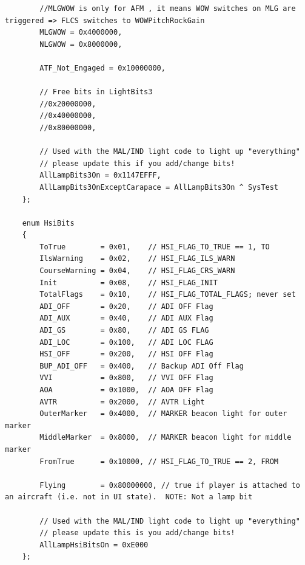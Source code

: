 \documentclass[11pt,letterpaper,titlepage]{article}
\begin{document}
\begin{landscape}
\begin{lstlisting}
		//MLGWOW is only for AFM , it means WOW switches on MLG are triggered => FLCS switches to WOWPitchRockGain
		MLGWOW = 0x4000000,
		NLGWOW = 0x8000000,

		ATF_Not_Engaged = 0x10000000,
		
		// Free bits in LightBits3		
		//0x20000000,
		//0x40000000,
		//0x80000000,

		// Used with the MAL/IND light code to light up "everything"
        // please update this if you add/change bits!
		AllLampBits3On = 0x1147EFFF,
		AllLampBits3OnExceptCarapace = AllLampBits3On ^ SysTest
    };

    enum HsiBits
    {
        ToTrue        = 0x01,    // HSI_FLAG_TO_TRUE == 1, TO
        IlsWarning    = 0x02,    // HSI_FLAG_ILS_WARN
        CourseWarning = 0x04,    // HSI_FLAG_CRS_WARN
        Init          = 0x08,    // HSI_FLAG_INIT
        TotalFlags    = 0x10,    // HSI_FLAG_TOTAL_FLAGS; never set
        ADI_OFF       = 0x20,    // ADI OFF Flag
        ADI_AUX       = 0x40,    // ADI AUX Flag
        ADI_GS        = 0x80,    // ADI GS FLAG
        ADI_LOC       = 0x100,   // ADI LOC FLAG
        HSI_OFF       = 0x200,   // HSI OFF Flag
        BUP_ADI_OFF   = 0x400,   // Backup ADI Off Flag
        VVI           = 0x800,   // VVI OFF Flag
        AOA           = 0x1000,  // AOA OFF Flag
        AVTR          = 0x2000,  // AVTR Light
		OuterMarker   = 0x4000,  // MARKER beacon light for outer marker
		MiddleMarker  = 0x8000,  // MARKER beacon light for middle marker
		FromTrue      = 0x10000, // HSI_FLAG_TO_TRUE == 2, FROM

		Flying		  = 0x80000000, // true if player is attached to an aircraft (i.e. not in UI state).  NOTE: Not a lamp bit

		// Used with the MAL/IND light code to light up "everything"
        // please update this is you add/change bits!
        AllLampHsiBitsOn = 0xE000
    };


\end{lstlisting}
\end{landscape}
\end{document}

